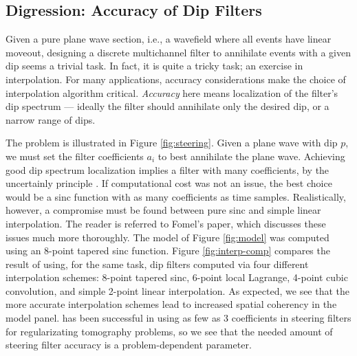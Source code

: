 

\subsection{Digression: Accuracy of Dip Filters}
Given a pure plane wave section, i.e., a wavefield where all events have linear 
moveout, designing a discrete multichannel filter to annihilate events with a given
dip seems a trivial task.  In fact, it is quite a tricky task; an exercise in
interpolation.  For many applications, accuracy considerations make the choice of 
interpolation algorithm critical.  {\em Accuracy} here means localization of the
filter's dip spectrum --- ideally the filter should annihilate only the desired
dip, or a narrow range of dips.  


The problem is illustrated in Figure \ref{fig:steering}.  Given a plane wave with
dip $p$, we must set the filter coefficients $a_i$ to best annihilate the plane wave.
Achieving good dip spectrum localization implies a filter with many coefficients, by the 
uncertainly principle \cite{bracewell}.  If computational cost was not an issue, the best
choice would be a sinc function with as many coefficients as time samples.
Realistically, however, a compromise must be found between pure sinc and 
simple linear interpolation.  The reader is referred to Fomel's  
paper, which discusses these issues much more
thoroughly.  The model of Figure \ref{fig:model} was computed using an 8-point
tapered sinc function.  Figure \ref{fig:interp-comp} compares
the result of using, for the same task,  dip filters computed via four different
interpolation schemes: 8-point tapered sinc, 6-point local Lagrange, 4-point cubic convolution,
and simple 2-point linear interpolation.  As expected, we see that the more 
accurate interpolation schemes lead to increased spatial coherency in the model panel.
 has been successful in using as few as 3 coefficients in steering
filters for regularizating tomography problems, so we see that the needed amount 
of steering filter accuracy is a problem-dependent parameter.

